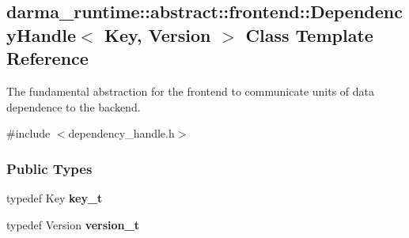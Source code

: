 \hypertarget{classdarma__runtime_1_1abstract_1_1frontend_1_1_dependency_handle}{}\subsection{darma\+\_\+runtime\+:\+:abstract\+:\+:frontend\+:\+:Dependency\+Handle$<$ Key, Version $>$ Class Template Reference}
\label{classdarma__runtime_1_1abstract_1_1frontend_1_1_dependency_handle}


The fundamental abstraction for the frontend to communicate units of data dependence to the backend.  




{\ttfamily \#include $<$dependency\+\_\+handle.\+h$>$}

\subsubsection*{Public Types}
\begin{DoxyCompactItemize}
\item 
typedef Key {\bfseries key\+\_\+t}\hypertarget{classdarma__runtime_1_1abstract_1_1frontend_1_1_dependency_handle_abd7fa3e4ff70e7cc555e35fd9a8cfcb4}{}\label{classdarma__runtime_1_1abstract_1_1frontend_1_1_dependency_handle_abd7fa3e4ff70e7cc555e35fd9a8cfcb4}

\item 
typedef Version {\bfseries version\+\_\+t}\hypertarget{classdarma__runtime_1_1abstract_1_1frontend_1_1_dependency_handle_a85eec61f65c30c7ab07a2a50a22d2cbc}{}\label{classdarma__runtime_1_1abstract_1_1frontend_1_1_dependency_handle_a85eec61f65c30c7ab07a2a50a22d2cbc}

\end{DoxyCompactItemize}
